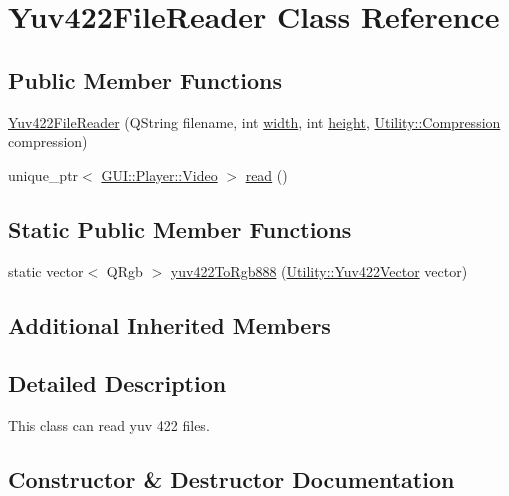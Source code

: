 \hypertarget{classUtility_1_1Yuv422FileReader}{}\section{Yuv422\+File\+Reader Class Reference}
\label{classUtility_1_1Yuv422FileReader}
\subsection*{Public Member Functions}
\begin{DoxyCompactItemize}
\item 
\hyperlink{classUtility_1_1Yuv422FileReader_a061cfaea6974d3d0ff811c44bf036edd}{Yuv422\+File\+Reader} (Q\+String filename, int \hyperlink{classUtility_1_1YuvFileReader_a2474a5474cbff19523a51eb1de01cda4}{width}, int \hyperlink{classUtility_1_1YuvFileReader_ad12fc34ce789bce6c8a05d8a17138534}{height}, \hyperlink{namespaceUtility_a56a83bf6847f4801f4205eb4be237ccf}{Utility\+::\+Compression} compression)
\item 
unique\+\_\+ptr$<$ \hyperlink{classGUI_1_1Player_1_1Video}{G\+U\+I\+::\+Player\+::\+Video} $>$ \hyperlink{classUtility_1_1Yuv422FileReader_a9dd03728ebb2e883f5cac8cb357fcd0e}{read} ()
\end{DoxyCompactItemize}
\subsection*{Static Public Member Functions}
\begin{DoxyCompactItemize}
\item 
static vector$<$ Q\+Rgb $>$ \hyperlink{classUtility_1_1Yuv422FileReader_a6f6b820735249f6dfd2d3ee75cccc886}{yuv422\+To\+Rgb888} (\hyperlink{classUtility_1_1Yuv422Vector}{Utility\+::\+Yuv422\+Vector} vector)
\end{DoxyCompactItemize}
\subsection*{Additional Inherited Members}


\subsection{Detailed Description}
This class can read yuv 422 files. 

\subsection{Constructor \& Destructor Documentation}
\hypertarget{classUtility_1_1Yuv422FileReader_a061cfaea6974d3d0ff811c44bf036edd}{}
